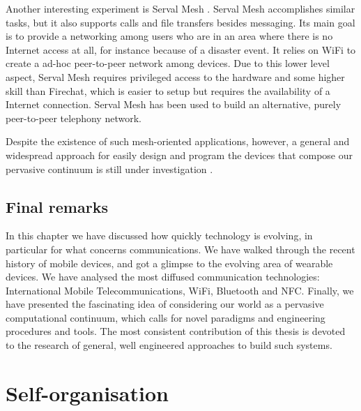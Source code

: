 \documentclass[12pt,a4paper,twoside,openright]{book}
\begin{document}
Another interesting experiment is Serval Mesh \cite{serval-mesh}.
%
Serval Mesh accomplishes similar tasks, but it also supports calls and file transfers besides messaging.
%
Its main goal is to provide a networking among users who are in an area where there is no Internet access at all, for instance because of a disaster event.
%
It relies on WiFi to create a ad-hoc peer-to-peer network among devices.
%
Due to this lower level aspect, Serval Mesh requires privileged access to the hardware and some higher skill than Firechat, which is easier to setup but requires the availability of a Internet connection.
%
Serval Mesh has been used \cite{mesh-network-telephony} to build an alternative, purely peer-to-peer telephony network.

Despite the existence of such mesh-oriented applications, however, a general and widespread approach for easily design and program the devices that compose our pervasive continuum is still under investigation \cite{Ray13}.

\section{Final remarks}

In this chapter we have discussed how quickly technology is evolving, in particular for what concerns communications.
%
We have walked through the recent history of mobile devices, and got a glimpse to the evolving area of wearable devices.
%
We have analysed the most diffused communication technologies: International Mobile Telecommunications, WiFi, Bluetooth and NFC.
%
Finally, we have presented the fascinating idea of considering our world as a pervasive computational continuum, which calls for novel paradigms and engineering procedures and tools.
%
The most consistent contribution of this thesis is devoted to the research of general, well engineered approaches to build such systems.

\chapter{Self-organisation}
\label{coordination-infrastructures}
\end{document}
